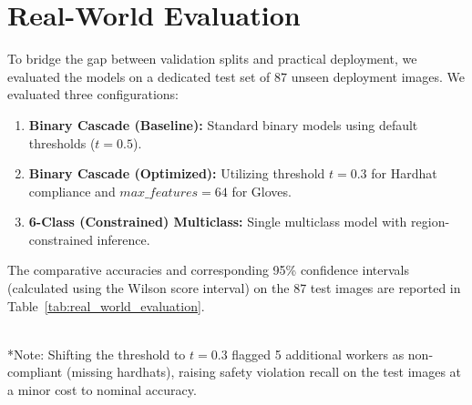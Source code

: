 \documentclass[11pt,a4paper]{article}
\begin{document}
\section{Real-World Evaluation}
\label{sec:real_world_evaluation}
To bridge the gap between validation splits and practical deployment, we evaluated the models on a dedicated test set of 87 unseen deployment images. We evaluated three configurations:
\begin{enumerate}
  \item \textbf{Binary Cascade (Baseline):} Standard binary models using default thresholds ($t=0.5$).
  \item \textbf{Binary Cascade (Optimized):} Utilizing threshold $t=0.3$ for Hardhat compliance and $max\_features=64$ for Gloves.
  \item \textbf{6-Class (Constrained) Multiclass:} Single multiclass model with region-constrained inference.
\end{enumerate}

The comparative accuracies and corresponding 95\% confidence intervals (calculated using the Wilson score interval) on the 87 test images are reported in Table~\ref{tab:real_world_evaluation}.

\begin{table}[H]
\centering
\caption{Real-World Evaluation Accuracy Comparison (N = 87)}
\label{tab:real_world_evaluation}
\\
\vspace{1mm}
\small{*Note: Shifting the threshold to $t=0.3$ flagged 5 additional workers as non-compliant (missing hardhats), raising safety violation recall on the test images at a minor cost to nominal accuracy.}
\end{table}
\end{document}
